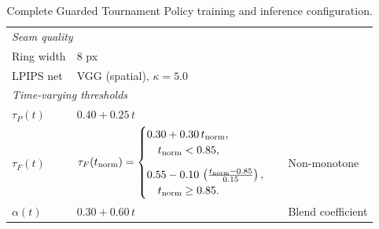 \begin{table}[h]
\begin{tabular}{lll}
\midrule
\multicolumn{3}{l}{\textit{Seam quality}} \\
Ring width        & 8 px & \\
LPIPS net         & VGG (spatial), $\kappa=5.0$ & \\
\midrule
\multicolumn{3}{l}{\textit{Time-varying thresholds}} \\
$\tau_P(t)$       & $0.40 + 0.25\,t$ & \\
$\tau_F(t)$       &$
\tau_F(t_{\text{norm}})=
\begin{cases}
0.30 + 0.30\, t_{\text{norm}}, \\
\quad t_{\text{norm}} < 0.85, \\[8pt]
0.55 - 0.10\,
\left(
\frac{t_{\text{norm}} - 0.85}{0.15}
\right), \\
\quad t_{\text{norm}} \geq 0.85.\notag
\end{cases}
$                 & Non-monotone \\
$\alpha(t)$       & $0.30 + 0.60\,t$ & Blend coefficient \\
\bottomrule
\end{tabular}
\caption{
  Complete Guarded Tournament Policy training and inference configuration.
}
\label{tab:tspo_config}
\end{table}


